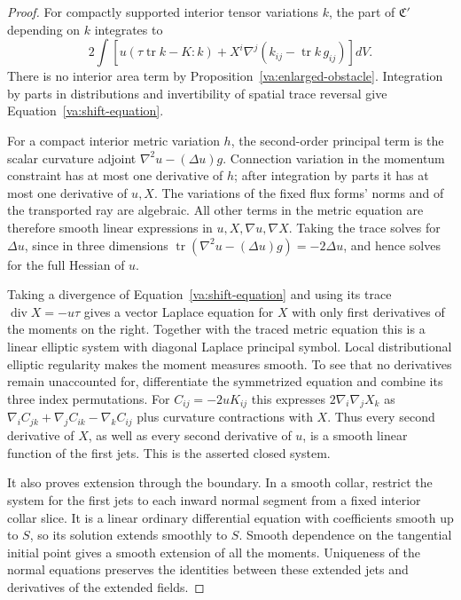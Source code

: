 \begin{proof}
For compactly supported interior tensor variations \(k\), the part of
\(\mathfrak C'\) depending on \(k\) integrates to
\[
 2\int\left[u(\tau\operatorname{tr}k-K:k)
                  +X^i\nabla^j(k_{ij}-\operatorname{tr}k\,g_{ij})\right]dV.
\]
There is no interior area term by
Proposition~\ref{va:enlarged-obstacle}.  Integration by parts in
distributions and invertibility of spatial trace reversal give
Equation~\eqref{va:shift-equation}.

For a compact interior metric variation \(h\), the second-order
principal term is the scalar curvature adjoint
\(\nabla^2u-(\Delta u)g\).  Connection variation in the momentum
constraint has at most one derivative of \(h\); after integration by
parts it has at most one derivative of \(u,X\).  The variations of the
fixed flux forms' norms and of the transported ray are algebraic.
All other terms in the metric equation are therefore smooth linear
expressions in \(u,X,\nabla u,\nabla X\).  Taking the trace solves for
\(\Delta u\), since in three dimensions
\(\operatorname{tr}(\nabla^2u-(\Delta u)g)=-2\Delta u\), and hence
solves for the full Hessian of \(u\).

Taking a divergence of Equation~\eqref{va:shift-equation} and using
its trace \(\operatorname{div}X=-u\tau\) gives a vector Laplace
equation for \(X\) with only first derivatives of the moments on the
right.  Together with the traced metric equation this is a linear
elliptic system with diagonal Laplace principal symbol.  Local
distributional elliptic regularity makes the moment measures smooth.
To see that no derivatives remain unaccounted for, differentiate the
symmetrized equation and combine its three index permutations.  For
\(C_{ij}=-2uK_{ij}\) this expresses
\(2\nabla_i\nabla_jX_k\) as
\(\nabla_iC_{jk}+\nabla_jC_{ik}-\nabla_kC_{ij}\) plus curvature
contractions with \(X\).  Thus every second derivative of \(X\), as
well as every second derivative of \(u\), is a smooth linear function
of the first jets.  This is the asserted closed system.

It also proves extension through the boundary.  In a smooth collar,
restrict the system for the first jets to each inward normal segment
from a fixed interior collar slice.  It is a linear ordinary
differential equation with coefficients smooth up to \(S\), so its
solution extends smoothly to \(S\).  Smooth dependence on the
tangential initial point gives a smooth extension of all the moments.
Uniqueness of the normal equations preserves the identities between
these extended jets and derivatives of the extended fields.


\end{proof}
